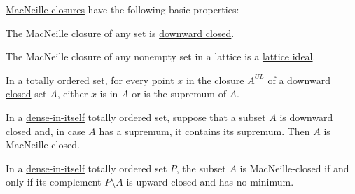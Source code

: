 \begin{proposition}\label{thm:def:macnielle_closure}
  \hyperref[def:macnielle_closure]{MacNeille closures} have the following basic properties:
  \begin{thmenum}
     The MacNeille closure of any set is \hyperref[def:closed_ordered_subset]{downward closed}.

     The MacNeille closure of any nonempty set in a lattice is a \hyperref[def:lattice_ideal]{lattice ideal}.

     In a \hyperref[def:totally_ordered_set]{totally ordered set}, for every point \( x \) in the closure \( A^{UL} \) of a \hyperref[def:closed_ordered_subset]{downward closed} set \( A \), either \( x \) is in \( A \) or is the supremum of \( A \).

     In a \hyperref[def:dense_total_order]{dense-in-itself} totally ordered set, suppose that a subset \( A \) is downward closed and, in case \( A \) has a supremum, it contains its supremum. Then \( A \) is MacNeille-closed.

     In a \hyperref[def:dense_total_order]{dense-in-itself} totally ordered set \( P \), the subset \( A \) is MacNeille-closed if and only if its complement \( P \setminus A \) is upward closed and has no minimum.
  \end{thmenum}
\end{proposition}

